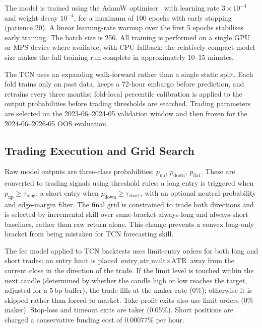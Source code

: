 The model is trained using the AdamW optimiser~\cite{loshchilov2019decoupled} with learning rate $3 \times 10^{-4}$ and weight decay $10^{-4}$, for a maximum of 100 epochs with early stopping (patience 20). A linear learning-rate warmup over the first 5 epochs stabilises early training. The batch size is 256. All training is performed on a single GPU or MPS device where available, with CPU fallback; the relatively compact model size makes the full training run complete in approximately 10--15 minutes.


The TCN uses an expanding walk-forward rather than a single static split. Each fold trains only on past data, keeps a 72-hour embargo before prediction, and retrains every three months; fold-local percentile calibration is applied to the output probabilities before trading thresholds are searched. Trading parameters are selected on the 2023-06--2024-05 validation window and then frozen for the 2024-06--2026-05 OOS evaluation.

\subsection{Trading Execution and Grid Search}

Raw model outputs are three-class probabilities: $p_{\text{up}}$, $p_{\text{down}}$, $p_{\text{flat}}$. These are converted to trading signals using threshold rules: a long entry is triggered when $p_{\text{up}} \geq \tau_{\text{long}}$; a short entry when $p_{\text{down}} \geq \tau_{\text{short}}$, with an optional neutral-probability and edge-margin filter. The final grid is constrained to trade both directions and is selected by incremental skill over same-bracket always-long and always-short baselines, rather than raw return alone. This change prevents a convex long-only bracket from being mistaken for TCN forecasting skill.


The fee model applied to TCN backtests uses limit-entry orders for both long and short trades: an entry limit is placed $\text{entry\_atr\_mult} \times \text{ATR}$ away from the current close in the direction of the trade. If the limit level is touched within the next candle (determined by whether the candle high or low reaches the target, adjusted for a 5\,bp buffer), the trade fills at the maker rate (0\%); otherwise it is skipped rather than forced to market. Take-profit exits also use limit orders (0\% maker). Stop-loss and timeout exits are taker (0.05\%). Short positions are charged a conservative funding cost of $0.00077\%$ per hour.

